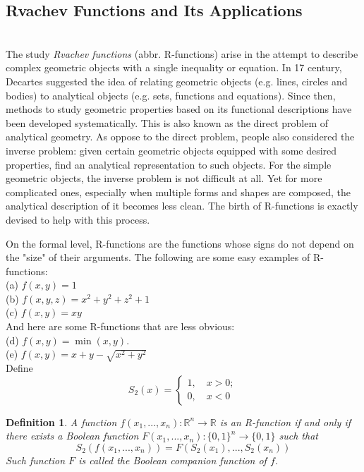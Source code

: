 \documentclass[11pt]{amsart}
\newtheorem{definition}{Definition}%
\theoremstyle{definition}
\begin{document}
\subsection{Rvachev Functions and Its Applications}~\\
The study \textit{Rvachev functions} (abbr. R-functions) arise in the attempt to describe complex geometric objects with a single inequality or equation. In 17 century, Decartes suggested the idea of relating geometric objects (e.g. lines, circles and bodies) to analytical objects (e.g. sets, functions and equations). Since then, methods to study geometric properties based on its functional descriptions have been developed systematically. This is also known as the direct problem of analytical geometry. As oppose to the direct problem, people also considered the inverse problem: given certain geometric objects equipped with some desired properties, find an analytical representation to such objects. For the simple geometric objects, the inverse problem is not difficult at all. Yet for more complicated ones, especially when multiple forms and shapes are composed, the analytical description of it becomes less clean. The birth of R-functions is exactly devised to help with this process.    

On the formal level, R-functions are the functions whose signs do not depend on the "size" of their arguments.  The following are some easy  examples of R-functions: \\
(a) $f(x,y)=1$\\
(b) $f(x,y,z)=x^2+y^2+z^2+1$\\
(c) $f(x,y)=xy$\\
And here are some R-functions that are less obvious:\\
(d) $f(x,y)=\min(x,y)$. \\
(e) $f(x,y)=x+y-\sqrt{x^2+y^2}$\\
Define 
$$S_2(x)=\begin{cases} 1,\quad x>0;\\ 0, \quad x<0\end{cases}$$
\begin{definition}
A function $f(x_1,...,x_n):\mathbb{R}^n\to\mathbb{R}$ is an R-function if and only if there exists a Boolean function $F(x_1,...,x_n):\{0,1\}^n\to \{0,1\}$ such that
$$S_2(f(x_1,...,x_n))=F(S_2(x_1),...,S_2(x_n))$$
Such function $F$ is called the Boolean companion function of $f$.
\end{definition}
\end{document}

